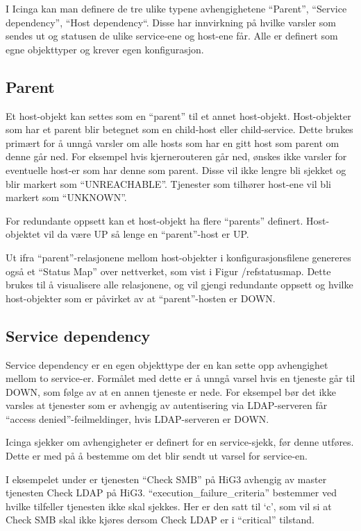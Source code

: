 I Icinga kan man definere de tre ulike typene avhengighetene “Parent”, “Service dependency”, “Host dependency“. Disse har innvirkning på hvilke varsler som sendes ut og statusen de ulike service-ene og host-ene får. Alle er definert som egne objekttyper og krever egen konfigurasjon. 

\subsection{Parent}
Et host-objekt kan settes som en “parent” til et annet host-objekt. Host-objekter som har et parent blir betegnet som en child-host eller child-service. Dette brukes primært for å unngå varsler om alle hosts som har en gitt host som parent om denne går ned. For eksempel hvis kjernerouteren går ned, ønskes ikke varsler for eventuelle host-er som har denne som parent. Disse vil ikke lengre bli sjekket og blir markert som “UNREACHABLE”. Tjenester som tilhører host-ene vil bli markert som “UNKNOWN”.

For redundante oppsett kan et host-objekt ha flere “parents” definert. Host-objektet vil da være UP så lenge en “parent”-host er UP.

Ut ifra “parent”-relasjonene mellom host-objekter i konfigurasjonsfilene genereres også et “Status Map” over nettverket, som vist i Figur /ref{statusmap}. Dette brukes til å visualisere alle relasjonene, og vil gjengi redundante oppsett og hvilke host-objekter som er påvirket av at “parent”-hosten er DOWN.

\subsection{Service dependency}

Service dependency er en egen objekttype der en kan sette opp avhengighet mellom to service-er. Formålet med dette er å unngå varsel hvis en tjeneste går til DOWN, som følge av at en annen tjeneste er nede. For eksempel bør det ikke varsles at tjenester som er avhengig av autentisering via LDAP-serveren får “access denied”-feilmeldinger, hvis LDAP-serveren er DOWN. 

Icinga sjekker om avhengigheter er definert for en service-sjekk, før denne utføres. Dette er med på å bestemme om det blir sendt ut varsel for service-en.

I eksempelet under er tjenesten “Check SMB” på HiG3 avhengig av master tjenesten Check LDAP på HiG3. “execution\_failure\_criteria” bestemmer ved hvilke tilfeller tjenesten ikke skal sjekkes. Her er den satt til ‘c’, som vil si at Check SMB skal ikke kjøres dersom Check LDAP er i “critical” tilstand.


